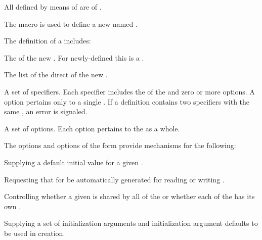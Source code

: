 \itemitem{\bull}                     
All  defined by means of  are
 of .
\endlist

\endsubsubsection%

           
The macro  is used to define a new named .  

The definition of a  includes:

\beginlist

\itemitem{\bull} The  of the new . 
  For newly-defined  this  is a .

\itemitem{\bull} The list of the direct  of the new . 

\itemitem{\bull} A set of  specifiers.
  Each  specifier includes the  of the  
  and zero or more  options.  A  option pertains 
  only to a single .  If a  definition contains
  two  specifiers with the same , an error is signaled.

\itemitem{\bull} A set of  options.  
  Each  option pertains to the  as a whole.  

\endlist
                                              
The  options and  options of 
the  form provide mechanisms for the following:

\beginlist

\itemitem{\bull} Supplying a default initial value  
for a given .  

\itemitem{\bull} Requesting that  for 
be automatically generated for reading or writing . 

\itemitem{\bull} Controlling whether a given  is shared by 
all 
of the  or whether each 
 of the  has its own .

\itemitem{\bull} Supplying a set of initialization arguments and initialization
argument defaults to be used in  creation.


